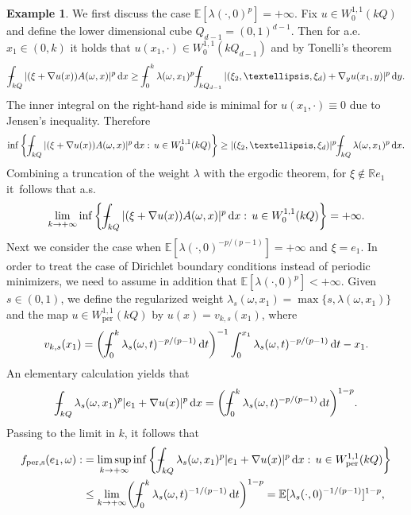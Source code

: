 \documentclass[11pt]{article}
\numberwithin{equation}{section}
\theoremstyle{definition}
\newtheorem{example}[theorem]{Example}
\def\Xint#1{\mathchoice
{\XXint\displaystyle\textstyle{#1}}%
{\XXint\textstyle\scriptstyle{#1}}%
{\XXint\scriptstyle\scriptscriptstyle{#1}}%
{\XXint\scriptscriptstyle\scriptscriptstyle{#1}}%
\!\int}
\def\XXint#1#2#3{{\setbox0=\hbox{$#1{#2#3}{\int}$ }
\vcenter{\hbox{$#2#3$ }}\kern-.57\wd0}}
\def\dashint{\Xint-}
\let\w\omega
\newcommand{\dx}{\,\mathrm{d}x}
\newcommand{\dy}{\,\mathrm{d}y}
\newcommand{\R}{\mathbb{R}}
\begin{document}
\begin{example}
We first discuss the case $\mathbb{E}[\lambda(\cdot,0)^p]=+\infty$. Fix $u\in W^{1,1}_0(kQ)$ and define the lower dimensional cube $Q_{d-1}=(0,1)^{d-1}$. Then for a.e.\ $x_1\in (0,k)$ it holds that $u(x_1,\cdot)\in W_0^{1,1}(kQ_{d-1})$ and by Tonelli's theorem
\begin{equation*}
\dashint_{kQ}|(\xi+\nabla u(x))A(\w,x)|^p\dx\geq\dashint_0^k\lambda(\w,x_1)^p \dashint_{kQ_{d-1}}|(\xi_2,\ldots,\xi_d)+\nabla_yu(x_1,y)|^p\dy.
\end{equation*}
The inner integral on the right-hand side is minimal for $u(x_1,\cdot)\equiv 0$ due to Jensen's inequality. Therefore
\begin{equation*}
\inf\left\{\dashint_{kQ}|(\xi+\nabla u(x))A(\w,x)|^p\dx:\,u\in W^{1,1}_0(kQ)\right\}\geq |(\xi_2,\ldots,\xi_d)|^p\dashint_{kQ}\lambda(\w,x_1)^p\dx.
\end{equation*}
Combining a truncation of the weight $\lambda$ with the ergodic theorem, for $\xi\notin\R e_1$ it~follows that a.s.
\begin{equation}\label{eq:toinfinity}
\lim_{k\to +\infty}\inf\left\{\dashint_{kQ}|(\xi+\nabla u(x))A(\w,x)|^p\dx:\,u\in W^{1,1}_0(kQ)\right\}=+\infty.
\end{equation}
Next we consider the case when $\mathbb{E}[\lambda(\cdot,0)^{-p/(p-1)}]=+\infty$ and $\xi=e_1$. In order to treat the case of Dirichlet boundary conditions instead of periodic minimizers, we need to assume in addition that $\mathbb{E}[\lambda(\cdot,0)^p]<+\infty$. Given $s\in (0,1)$, we define the regularized weight $\lambda_s(\w,x_1)=\max\{s,\lambda(\w,x_1)\}$ and the map $u\in W^{1,1}_\mathrm{per}(kQ)$ by $u(x)=v_{k,s}(x_1)$, where
\begin{equation*}
v_{k,s}(x_1)=\biggl(\dashint_0^k\lambda_s(\w,t)^{-p/(p-1)}\,\mathrm{d}t\biggr)^{-1}\int_0^{x_1}\lambda_s(\w,t)^{-p/(p-1)}\,\mathrm{d}t-x_1.
\end{equation*}
An elementary calculation yields that
\begin{align*}
\dashint_{kQ}\lambda_s(\w,x_1)^p|e_1+\nabla u(x)|^p\dx= \biggl(\dashint_0^k\lambda_s(\w,t)^{-p/(p-1)}\,\mathrm{d}t\biggr)^{1-p}.
\end{align*}
Passing to the limit in $k$, it follows that
\begin{align*}
f_\mathrm{per,s}(e_1,\w):&=\limsup_{k\to +\infty}\inf\left\{\dashint_{kQ}\lambda_{s}(\w,x_1)^p|e_1+\nabla u(x)|^p\dx:\,u\in W^{1,1}_\mathrm{per}(kQ)\right\}
\\
&\leq \lim_{k\to +\infty}\biggl(\dashint_0^k\lambda_s(\w,t)^{-1/(p-1)}\,\mathrm{d}t\biggr)^{1-p}=\mathbb{E}[\lambda_s(\cdot,0)^{-1/(p-1)}]^{1-p},

\end{align*}
\end{example}
\end{document}
